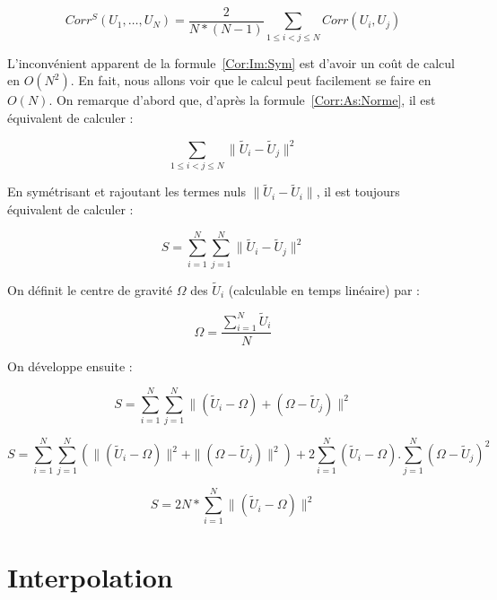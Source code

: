 \begin{equation}
   Corr^S(U_1,\dots,U_N) =
    \frac{2}{N*(N-1)} \sum_{1\leq i < j \leq N} Corr(U_i,U_j)
   \label{Cor:Im:Sym}
\end{equation}

L'inconv\'enient apparent de la formule~\ref{Cor:Im:Sym} est d'avoir
un co\^ut de calcul en $O(N^2)$. En fait, nous allons voir que
le calcul peut facilement se faire en $O(N)$. On remarque d'abord
que, d'apr\`es la formule~\ref{Corr:As:Norme}, il est \'equivalent
de calculer :

\begin{equation}
    \sum_{1\leq i < j \leq N} \|\tilde{U}_i-\tilde{U}_j\|^2
\end{equation}


En sym\'etrisant et rajoutant les termes nuls  $\|\tilde{U}_i-\tilde{U}_i\|$,
il est toujours \'equivalent de calculer :

\begin{equation}
    S=\sum_{i=1}^N \sum_{j=1}^N  \|\tilde{U}_i-\tilde{U}_j\|^2
\end{equation}

On d\'efinit le centre de gravit\'e $\Omega$ des $\tilde{U}_i$
(calculable en temps lin\'eaire) par :

\begin{equation}
    \Omega = \frac{\sum_{i=1}^N \tilde{U}_i}{N}
\end{equation}

On d\'eveloppe ensuite :

\begin{equation}
    S=\sum_{i=1}^N \sum_{j=1}^N  \|(\tilde{U}_i-\Omega) +(\Omega-\tilde{U}_j)\|^2
\end{equation}

\begin{equation}
    S= \sum_{i=1}^N \sum_{j=1}^N  (\|(\tilde{U}_i-\Omega)\|^2 +\|(\Omega-\tilde{U}_j)\|^2 )
       +2\sum_{i=1}^N  (\tilde{U}_i-\Omega). \sum_{j=1}^N  (\Omega-\tilde{U}_j)^2
\end{equation}

\begin{equation}
    S= 2N * \sum_{i=1}^N  \|(\tilde{U}_i-\Omega) \|^2
\end{equation}


\section{Interpolation}

